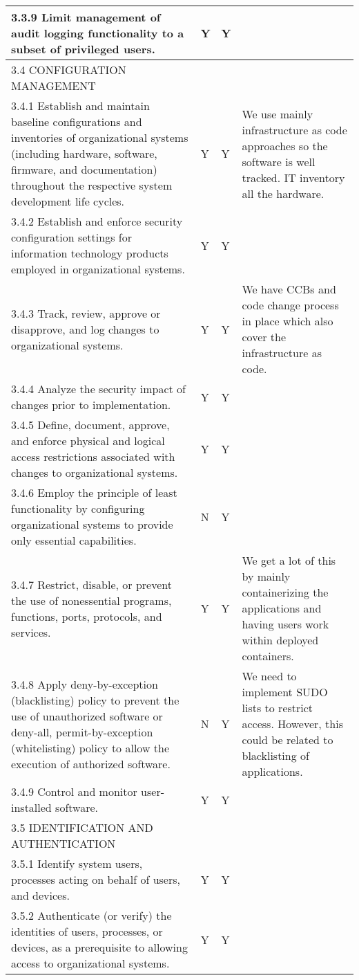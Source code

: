 \begin{longtable} {|p{}|p{}|p{}|p{} |}
{3.3.9 Limit management of audit logging functionality to a subset of privileged users.}&{Y}&{Y}& \\ \hline
{3.4 CONFIGURATION MANAGEMENT}&&& \\ \hline
{3.4.1 Establish and maintain baseline configurations and inventories of organizational systems (including hardware, software, firmware, and documentation) throughout the respective system development life cycles.}&{Y}&{Y}&{We use mainly infrastructure as code approaches so the software is well tracked. IT inventory all the hardware. } \\ \hline
{3.4.2 Establish and enforce security configuration settings for information technology products employed in organizational systems.}&{Y}&{Y}& \\ \hline
{3.4.3 Track, review, approve or disapprove, and log changes to organizational systems.}&{Y}&{Y}&{We have CCBs and code change process in place which also cover the infrastructure as code. } \\ \hline
{3.4.4 Analyze the security impact of changes prior to implementation.}&{Y}&{Y}& \\ \hline
{3.4.5 Define, document, approve, and enforce physical and logical access restrictions associated with changes to organizational systems.}&{Y}&{Y}& \\ \hline
{3.4.6 Employ the principle of least functionality by configuring organizational systems to provide only essential capabilities.}&{N}&{Y}& \\ \hline
{3.4.7 Restrict, disable, or prevent the use of nonessential programs, functions, ports, protocols, and services.}&{Y}&{Y}&{We get a lot of this by mainly containerizing the applications and having users work within deployed containers.} \\ \hline
{3.4.8 Apply deny-by-exception (blacklisting) policy to prevent the use of unauthorized software or deny-all, permit-by-exception (whitelisting) policy to allow the execution of authorized software.}&{N}&{Y}&{We need to implement SUDO lists to restrict access. However, this could be related to blacklisting of applications.} \\ \hline
{3.4.9 Control and monitor user-installed software.}&{Y}&{Y}& \\ \hline
{3.5 IDENTIFICATION AND AUTHENTICATION}&&& \\ \hline
{3.5.1 Identify system users, processes acting on behalf of users, and devices.}&{Y}&{Y}& \\ \hline
{3.5.2 Authenticate (or verify) the identities of users, processes, or devices, as a prerequisite to allowing access to organizational systems.}&{Y}&{Y}& \\ \hline

\end{longtable}
